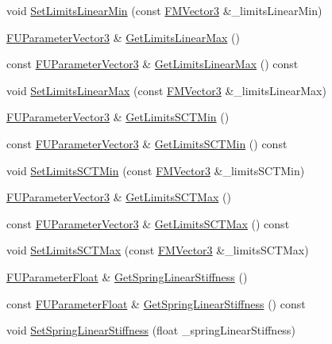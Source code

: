 \begin{DoxyCompactItemize}
void \hyperlink{classFCDPhysicsRigidConstraint_a2fe79d00bba974be3c40a884dad9c668}{SetLimitsLinearMin} (const \hyperlink{classFMVector3}{FMVector3} \&\_\-limitsLinearMin)
\item 
\hyperlink{classFUParameterT}{FUParameterVector3} \& \hyperlink{classFCDPhysicsRigidConstraint_aba63d3bd2428186d190dfe3944ba55aa}{GetLimitsLinearMax} ()
\item 
const \hyperlink{classFUParameterT}{FUParameterVector3} \& \hyperlink{classFCDPhysicsRigidConstraint_af64f85d15f8043b0349c336c2fb2d60d}{GetLimitsLinearMax} () const 
\item 
void \hyperlink{classFCDPhysicsRigidConstraint_a3561f4f05b63b865c25b283c28e286e2}{SetLimitsLinearMax} (const \hyperlink{classFMVector3}{FMVector3} \&\_\-limitsLinearMax)
\item 
\hyperlink{classFUParameterT}{FUParameterVector3} \& \hyperlink{classFCDPhysicsRigidConstraint_a20ea69483dccff0b6adbc7e831043c48}{GetLimitsSCTMin} ()
\item 
const \hyperlink{classFUParameterT}{FUParameterVector3} \& \hyperlink{classFCDPhysicsRigidConstraint_ac5a98c8471f032985c60d0de7aea3d13}{GetLimitsSCTMin} () const 
\item 
void \hyperlink{classFCDPhysicsRigidConstraint_a5e132af0e4279a8b5e953603cd2b8eb0}{SetLimitsSCTMin} (const \hyperlink{classFMVector3}{FMVector3} \&\_\-limitsSCTMin)
\item 
\hyperlink{classFUParameterT}{FUParameterVector3} \& \hyperlink{classFCDPhysicsRigidConstraint_abf33f31354bbcc096c84d3fae2db463b}{GetLimitsSCTMax} ()
\item 
const \hyperlink{classFUParameterT}{FUParameterVector3} \& \hyperlink{classFCDPhysicsRigidConstraint_a8974e4bc1cc245b8f618c9d81809253c}{GetLimitsSCTMax} () const 
\item 
void \hyperlink{classFCDPhysicsRigidConstraint_ae9ea41b987feed7065a3748ae94b689e}{SetLimitsSCTMax} (const \hyperlink{classFMVector3}{FMVector3} \&\_\-limitsSCTMax)
\item 
\hyperlink{classFUParameterT}{FUParameterFloat} \& \hyperlink{classFCDPhysicsRigidConstraint_af04ab7b87dc559dc3fc22f1ae2ba3d1c}{GetSpringLinearStiffness} ()
\item 
const \hyperlink{classFUParameterT}{FUParameterFloat} \& \hyperlink{classFCDPhysicsRigidConstraint_ab10c7ddef6e04594695cc5dbd122dd86}{GetSpringLinearStiffness} () const 
\item 
void \hyperlink{classFCDPhysicsRigidConstraint_ab229222b68cc31d15113f6921e4ee3d3}{SetSpringLinearStiffness} (float \_\-springLinearStiffness)

\end{DoxyCompactItemize}

